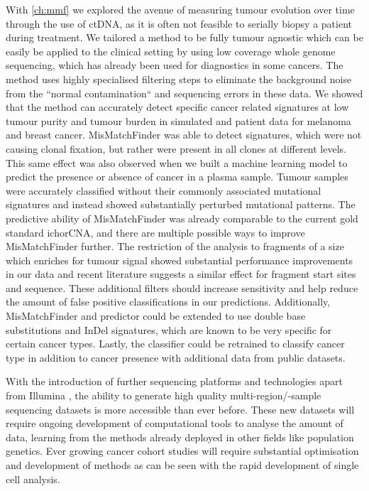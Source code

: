 With \autoref{ch:mmf} we explored the avenue of measuring tumour evolution over time through the use of ctDNA, as it is often not feasible to  serially biopsy a patient during treatment. We tailored a method to be fully tumour agnostic which can be easily be applied to the clinical setting by using low coverage whole genome sequencing, which has already been used for diagnostics in some cancers. The method uses highly specialised filtering steps to eliminate the background noise from the ``normal contamination`` and sequencing errors in these data. We showed that the method can accurately detect specific cancer related signatures at low tumour purity and tumour burden in simulated and patient data for melanoma and breast cancer. MisMatchFinder was able to detect signatures, which were not causing clonal fixation, but rather were present in all clones at different levels. This same effect was also observed when we built a machine learning model to predict the presence or absence of cancer in a plasma sample. Tumour samples were accurately classified without their commonly associated mutational signatures and instead showed substantially perturbed mutational patterns. The predictive ability of MisMatchFinder was already comparable to the current gold standard ichorCNA, and there are multiple possible ways to improve MisMatchFinder further. The restriction of the analysis to fragments of a size which enriches for tumour signal showed substantial performance improvements in our data and recent literature suggests a similar effect for fragment start sites and sequence. These additional filters should increase sensitivity and help reduce the amount of false positive classifications in our predictions. Additionally, MisMatchFinder and predictor could be extended to use double base substitutions and InDel signatures, which are known to be very specific for certain cancer types. Lastly, the classifier could be retrained to classify cancer type in addition to cancer presence with additional data from public datasets.

With the introduction of further sequencing platforms and technologies apart from Illumina \cite{SingularGenomics2021,UltimaGenomics2022,ElementBiosciences2022}, the ability to generate high quality multi-region/-sample sequencing datasets is more accessible than ever before. These new datasets will require ongoing development of computational tools to analyse the amount of data, learning from the methods already deployed in other fields like population genetics. Ever growing cancer cohort studies will require substantial optimisation and development of methods as can be seen with the rapid development of single cell analysis. 

